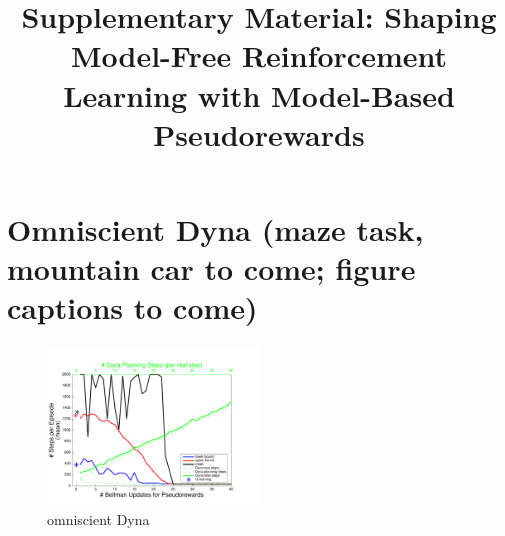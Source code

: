 \documentclass[letterpaper]{article}
\begin{document}
%

\title{Supplementary Material: Shaping Model-Free Reinforcement Learning with Model-Based Pseudorewards}
\date{}
\maketitle

\pagebreak

\section{Omniscient Dyna (maze task, mountain car to come; figure captions to come)}

\begin{figure}[ht]
\centering
\includegraphics[width=0.5\textwidth]{learning_vs_PRiterations_omniscientDYNA_mean}
\caption{omniscient Dyna}
\label{fig:sS1a}
\end{figure}
\end{document}
